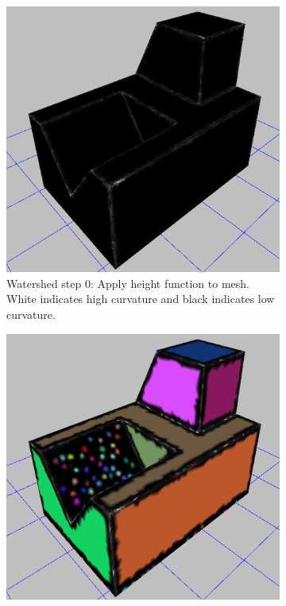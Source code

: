 \begin{figure}[htb]
	\centering
	\begin{subfigure}{0.45\textwidth}
		\centering
		\includegraphics[width=\linewidth]{../resources/watershed/fc028_WS0.png}
		\caption{Watershed step 0: Apply height function to mesh. White indicates high curvature and black indicates low curvature.}
		\label{sfig:ws_dk}
	\end{subfigure}
	\hfill
	\begin{subfigure}{0.45\textwidth}
		\centering
		\includegraphics[width=\linewidth]{../resources/watershed/fc028_WS1.png}

\end{subfigure}
\end{figure}
